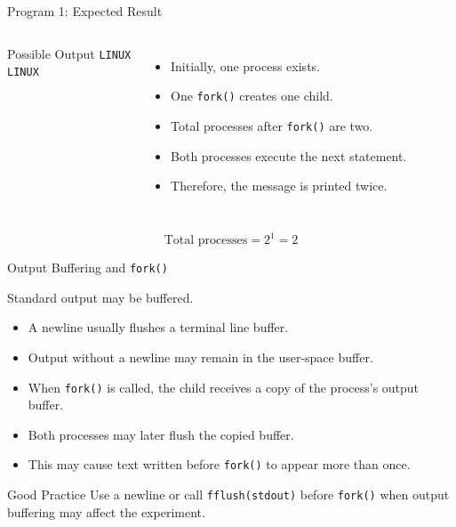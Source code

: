 \documentclass[aspectratio=169]{beamer}
\begin{document}
\begin{frame}{Program 1: Expected Result}

\begin{columns}


\begin{block}{Possible Output}
\texttt{LINUX}\\
\texttt{LINUX}
\end{block}


\begin{itemize}
    \item Initially, one process exists.
    \item One \texttt{fork()} creates one child.
    \item Total processes after \texttt{fork()} are two.
    \item Both processes execute the next statement.
    \item Therefore, the message is printed twice.
\end{itemize}

\end{columns}

\vspace{0.4cm}

\begin{center}
\Large
\[
\text{Total processes}=2^1=2
\]
\end{center}

\end{frame}

\begin{frame}{Output Buffering and \texttt{fork()}}

Standard output may be buffered.

\begin{itemize}
    \item A newline usually flushes a terminal line buffer.
    \item Output without a newline may remain in the user-space buffer.
    \item When \texttt{fork()} is called, the child receives a copy of the
    process's output buffer.
    \item Both processes may later flush the copied buffer.
    \item This may cause text written before \texttt{fork()} to appear more than
    once.
\end{itemize}

\begin{alertblock}{Good Practice}
Use a newline or call \texttt{fflush(stdout)} before \texttt{fork()} when output
buffering may affect the experiment.
\end{alertblock}

\end{frame}
\end{document}
